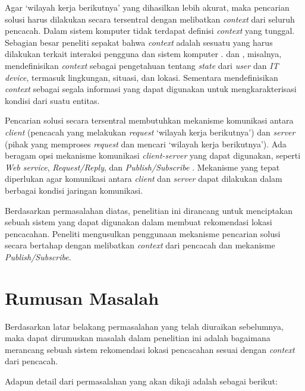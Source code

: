 Agar `wilayah kerja berikutnya' yang dihasilkan lebih akurat, maka pencarian solusi harus dilakukan secara tersentral dengan melibatkan \textit{context} dari seluruh pencacah. Dalam sistem komputer tidak terdapat definisi \textit{context} yang tunggal. Sebagian besar peneliti sepakat bahwa \textit{context} adalah sesuatu yang harus dilakukan terkait interaksi pengguna dan sistem komputer \citep{chen_survey_2000}. \citep{schilit_context-aware_1994} dan  \citep{schmidt_there_1999}, misalnya, mendefinisikan \textit{context} sebagai pengetahuan tentang \textit{state} dari \textit{user} dan \textit{IT device}, termasuk lingkungan, situasi, dan lokasi. Sementara \citep{abowd_towards_1999} mendefinisikan \textit{context} sebagai segala informasi yang dapat digunakan untuk mengkarakterisasi kondisi dari suatu entitas.


Pencarian solusi secara tersentral membutuhkan mekanisme komunikasi antara \textit{client} (pencacah yang melakukan \textit{request} `wilayah kerja berikutnya') dan \textit{server} (pihak yang memproses \textit{request} dan mencari `wilayah kerja berikutnya'). Ada beragam opsi mekanisme komunikasi \textit{client-server} yang dapat digunakan, seperti \textit{Web service}, \textit{Request/Reply}, dan \textit{Publish/Subscribe} \citep{weise_solving_2009, sengoku_fast_1998, sarmenta_bayanihan_2002, muhl_large-scale_2002}. Mekanisme yang tepat diperlukan agar komunikasi antara \textit{client} dan \textit{server} dapat dilakukan dalam berbagai kondisi jaringan komunikasi.


Berdasarkan permasalahan diatas, penelitian ini dirancang untuk menciptakan sebuah sistem yang dapat digunakan dalam membuat rekomendasi lokasi pencacahan. Peneliti mengusulkan penggunaan mekanisme pencarian solusi secara bertahap dengan melibatkan \textit{context} dari pencacah dan mekanisme \textit{Publish/Subscribe}.


\section{Rumusan Masalah}
Berdasarkan latar belakang permasalahan yang telah diuraikan sebelumnya, maka dapat dirumuskan masalah dalam penelitian ini adalah bagaimana merancang sebuah sistem rekomendasi lokasi pencacahan sesuai dengan \textit{context} dari pencacah.


Adapun detail dari permasalahan yang akan dikaji adalah sebagai berikut:

